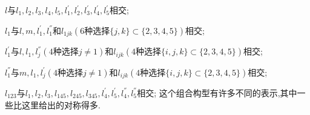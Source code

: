 \documentclass[UTF8]{book}
\begin{document}
	$l\text{与}l_{1},l_{2},l_{3},l_{4},l_{5},l^{'}_{1},l^{'}_{2},l^{'}_{3},l^{'}_{4},l^{'}_{5}\text{相交}$;
	
	$l_{1}\text{与}l,m,l^{'}_{1},l^{''}_{1}\text{和}l_{1jk}(6\text{种选择}\{j,k\}\subset \{2,3,4,5\})\text{相交}$;
	
	$l^{'}_{1}\text{与}l,l_{1},l^{''}_{j}(4种选择j\neq 1)\text{和}l_{ijk}(4\text{种选择}\{i,j,k\}\subset \{2,3,4,5\})\text{相交}$;
	
	$l^{''}_{1}\text{与}m,l_{1},l^{'}_{j}(4种选择j\neq 1)\text{和}l_{ijk}(4\text{种选择}\{i,j,k\}\subset \{2,3,4,5\})\text{相交}$;
	
	$l_{123}\text{与}l_{1},l_{2},l_{3},l_{145},l_{245},l_{345}, l^{'}_{4},l^{'}_{5},l^{''}_{4},l^{''}_{5}\text{相交}$;
	这个组合构型有许多不同的表示,其中一些比这里给出的对称得多.
	
\end{document}
